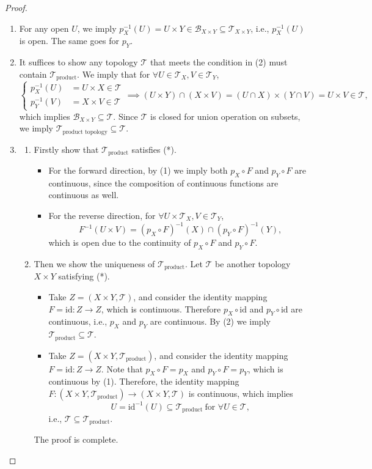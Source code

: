 \begin{proof}
\begin{enumerate}
\item
For any open $U$, we imply $p_X^{-1}(U)=U\times Y\in\mathcal{B}_{X\times Y}\subseteq\mathcal{T}_{X\times Y}$, i.e., $p_X^{-1}(U)$ is open. The same goes for $p_Y$.
\item
It suffices to show any topology $\mathcal{T}$ that meets the condition in (2) must contain $\mathcal{T}_{\text{product}}$. We imply that for $\forall U\in\mathcal{T}_X,V\in\mathcal{T}_Y$, 
\[
\left\{
\begin{aligned}
p_X^{-1}(U)&=U\times X\in\mathcal{T}\\
p_Y^{-1}(V)&=X\times V\in\mathcal{T}
\end{aligned}
\right.
\implies
(U\times Y)\cap(X\times V)=(U\cap X)\times (Y\cap V)=U\times V\in\mathcal{T},
\]
which implies $\mathcal{B}_{X\times Y}\subseteq\mathcal{T}$. Since $\mathcal{T}$ is closed for union operation on subsets, we imply $\mathcal{T}_{\text{product topology}}\subseteq\mathcal{T}$.
\item
\begin{enumerate}
\item
Firstly show that $\mathcal{T}_{\text{product}}$ satisfies (*).
\begin{itemize}
\item
For the forward direction, by (1) we imply both $p_X\circ F$ and $p_Y\circ F$ are continuous, since the composition of continuous functions are continuous as well.
\item
For the reverse direction, for $\forall U\times\mathcal{T}_X,V\in\mathcal{T}_Y$,
\[
F^{-1}(U\times V)=(p_X\circ F)^{-1}(X)\cap (p_Y\circ F)^{-1}(Y),
\]
which is open due to the continuity of $p_X\circ F$ and $p_Y\circ F$.
\end{itemize}
\item
Then we show the uniqueness of $\mathcal{T}_{\text{product}}$. Let $\mathcal{T}$ be another topology $X\times Y$ satisfying (*).
\begin{itemize}
\item
Take $Z=(X\times Y,\mathcal{T})$, and consider the identity mapping $F=\text{id}:Z\to Z$, which is continuous. Therefore $p_X\circ\text{id}$ and $p_Y\circ\text{id}$ are continuous, i.e., $p_X$ and $p_Y$ are continuous. By (2) we imply $\mathcal{T}_{\text{product}}\subseteq\mathcal{T}$.
\item
Take $Z=(X\times Y,\mathcal{T}_{\text{product}})$, and consider the identity mapping $F=\text{id}:Z\to Z$. Note that $p_X\circ F=p_X$ and $p_Y\circ F=p_Y$, which is continuous by (1). Therefore, the identity mapping $F:(X\times Y,\mathcal{T}_{\text{product}})\to(X\times Y,\mathcal{T})$ is continuous, which implies
\[
U=\text{id}^{-1}(U)\subseteq\mathcal{T}_{\text{product}}\ \text{for }\forall U\in\mathcal{T},
\]
i.e., $\mathcal{T}\subseteq\mathcal{T}_{\text{product}}.$
\end{itemize}
The proof is complete.
\end{enumerate}


\end{enumerate}
\end{proof}

